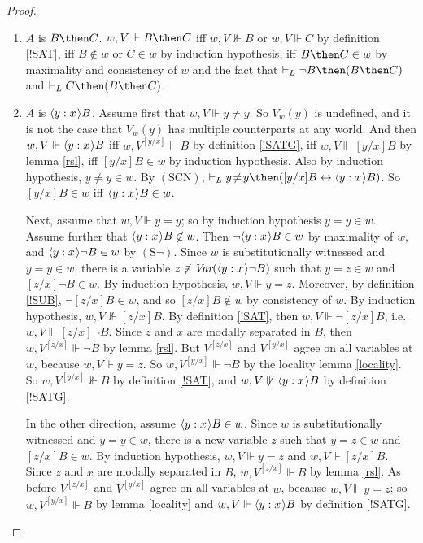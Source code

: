 \documentclass[11pt]{woarticle}
\theoremstyle{break}
\theoremstyle{nonumberplain}
\newcommand{\SAT}{\Vdash}
\newcommand{\1}{\;\,|\;\,}
\newcommand{\var}{\emph{Var}}
\renewcommand{\t}[1]{\ensuremath{\langle #1  \makebox[.2ex]{}\rangle}}
\newcommand{\T}[1]{\ensuremath{(\mathrm{ #1})}}
\begin{document}
\begin{proof}
\begin{enumerate}
  \item $A$ is $B \then C$.\; $w,V \SAT B \then C$ iff $w,V \not\SAT
    B$ or $w,V \SAT C$ by definition \ref{!SAT}, iff $B \not\in w$ or
    $C \in w$ by induction hypothesis, iff $B \then C \in w$ by
    maximality and consistency of $w$ and the fact that $\vdash_L \neg
    B \then (B \then C)$ and $\vdash_L C \then (B \then C)$.
 
  \item $A$ is $\t{y:x}B$.\; Assume first that $w,V \SAT
    y\!\not=\!y$. So $V_w(y)$ is undefined, and it is not the case
    that $V_w(y)$ has multiple counterparts at any world. And then
    $w,V \SAT \t{y:x}B$ iff $w,V^{[y/x]} \SAT B$ by definition
    \ref{!SATG}, iff $w,V \SAT [y/x]B$ by lemma \ref{rsl}, iff $[y/x]B
    \in w$ by induction hypothesis. Also by induction hypothesis,
    $y\!\not=\!y \in w$. By \T{SCN}, $\vdash_L y\!\not=\!y \then
    ([y/x]B \leftrightarrow \t{y:x}B)$. So $[y/x]B \in w$ iff
    $\t{y:x}B \in w$.

    Next, assume that $w,V \SAT y\!=\!y$; so by induction hypothesis
    $y\!=\!y \in w$. Assume further that $\t{y:x}B \not\in w$. Then
    $\neg\t{y:x}B \in w$ by maximality of $w$, and $\t{y:x}\neg B \in
    w$ by \T{S\neg}.  Since $w$ is substitutionally witnessed and
    $y\!=\!y \in w$, there is a variable $z \not\in \var(\t{y:x}\neg
    B)$ such that $y\!=\!z \in w$ and $[z/x] \neg B \in w$. By
    induction hypothesis, $w,V \SAT y\!=\!z$. Moreover, by definition
    \ref{!SUB}, $\neg [z/x]B \in w$, and so $[z/x]B \not\in w$ by
    consistency of $w$. By induction hypothesis, $w,V \not\SAT
    [z/x]B$. By definition \ref{!SAT}, then $w,V \SAT \neg [z/x]B$,
    i.e.\ $w,V \SAT [z/x]\neg B$. Since $z$ and $x$ are modally
    separated in $B$, then $w,V^{[z/x]} \SAT \neg B$ by lemma
    \ref{rsl}. But $V^{[z/x]}$ and $V^{[y/x]}$ agree on all variables
    at $w$, because $w,V \SAT y\!=\!z$. So $w,V^{[y/x]} \SAT \neg B$
    by the locality lemma \ref{locality}. So $w,V^{[y/x]} \not\SAT B$
    by definition \ref{!SAT}, and $w,V \not\SAT \t{y:x} B$ by
    definition \ref{!SATG}.

    In the other direction, assume $\t{y:x}B \in w$. Since $w$ is
    substitutionally witnessed and $y\!=\!y \in w$, there is a new
    variable $z$ such that $y\!=\!z \in w$ and $[z/x] B \in w$. By
    induction hypothesis, $w,V \SAT y\!=\!z$ and $w,V \SAT
    [z/x]B$. Since $z$ and $x$ are modally separated in $B$,
    $w,V^{[z/x]} \SAT B$ by lemma \ref{rsl}. As before $V^{[z/x]}$ and
    $V^{[y/x]}$ agree on all variables at $w$, because $w,V \SAT
    y\!=\!z$; so $w,V^{[y/x]} \SAT B$ by lemma \ref{locality} and $w,V
    \SAT \t{y:x} B$ by definition \ref{!SATG}.


\end{enumerate}
\end{proof}
\end{document}

